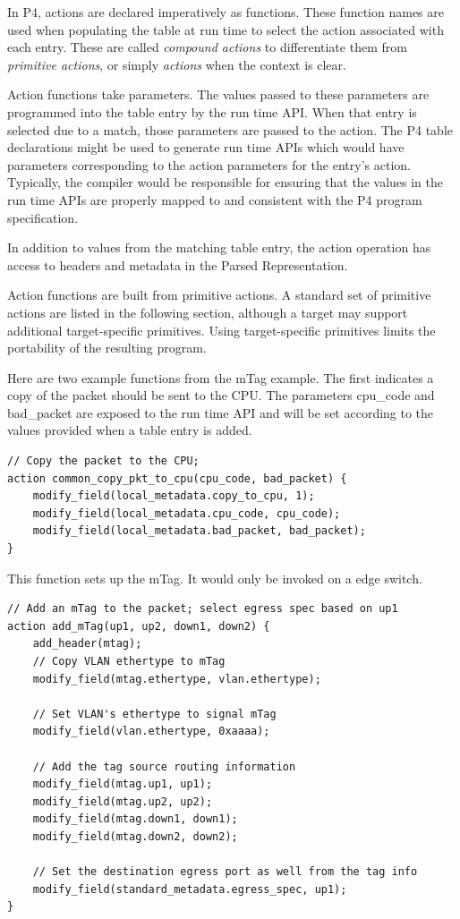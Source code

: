 \documentclass[12pt]{article}
\begin{document}

In P4, actions are declared imperatively as functions. These function
names are used when populating the table at run time to select the
action associated with each entry. These are called \textit{compound
actions} to differentiate them from \textit{primitive actions}, or
simply \textit{actions} when the context is clear.

Action functions take parameters. The values passed to these
parameters are programmed into the table entry by the run time
API. When that entry is selected due to a match, those parameters are
passed to the action. The P4 table declarations might be used to
generate run time APIs which would have parameters corresponding to
the action parameters for the entry's action.  Typically, the compiler
would be responsible for ensuring that the values in the run time APIs
are properly mapped to and consistent with the P4 program
specification.

In addition to values from the matching table entry, the action operation 
has access to headers and metadata in the Parsed Representation.

Action functions are built from primitive actions. A standard set of
primitive actions are listed in the following section, although a
target may support additional target-specific primitives. Using
target-specific primitives limits the portability of the resulting
program.

Here are two example functions from the mTag example.  The first indicates 
a copy of the packet should be sent to the CPU.  The parameters cpu_code 
and bad_packet are exposed to the run time API and will be set according 
to the values provided when a table entry is added.

\begin{lstlisting}[keywords={},frame=single,escapechar=\@]
// Copy the packet to the CPU;
action common_copy_pkt_to_cpu(cpu_code, bad_packet) {
    modify_field(local_metadata.copy_to_cpu, 1);
    modify_field(local_metadata.cpu_code, cpu_code);
    modify_field(local_metadata.bad_packet, bad_packet);
}
\end{lstlisting}


This function sets up the mTag. It would only be invoked on a edge switch.

\begin{lstlisting}[keywords={},frame=single,escapechar=\@]
// Add an mTag to the packet; select egress spec based on up1
action add_mTag(up1, up2, down1, down2) {
    add_header(mtag);
    // Copy VLAN ethertype to mTag
    modify_field(mtag.ethertype, vlan.ethertype);

    // Set VLAN's ethertype to signal mTag
    modify_field(vlan.ethertype, 0xaaaa);

    // Add the tag source routing information
    modify_field(mtag.up1, up1);
    modify_field(mtag.up2, up2);
    modify_field(mtag.down1, down1);
    modify_field(mtag.down2, down2);

    // Set the destination egress port as well from the tag info
    modify_field(standard_metadata.egress_spec, up1);
}
\end{lstlisting}
\end{document}
